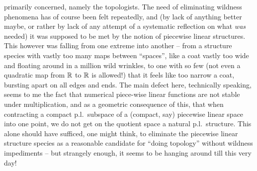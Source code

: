 primarily concerned, namely the topologists. The need of eliminating
wildness phenomena has of course been felt repeatedly, and (by lack of
anything better maybe, or rather by lack of any attempt of a
systematic reflection on what \emph{was} needed) it was supposed to be
met by the notion of piecewise linear structures. This however was
falling from one extreme into another -- from a structure species with
vastly too many maps between ``spaces'', like a coat vastly too wide
and floating around in a million wild wrinkles, to one with so few
(not even a quadratic map from ${\mathbb{R}}$ to ${\mathbb{R}}$ is allowed!) that it
feels like too narrow a coat, bursting apart on all edges and
ends. The main defect here, technically speaking, seems to me the fact
that numerical piece-wise linear functions are not stable under
multiplication, and as a geometric consequence of this, that when
contracting a compact p.l.\ subspace of a (compact, say) piecewise
linear space into one point, we do not get on the quotient space a
natural p.l.\ structure. This alone should have sufficed, one might
think, to eliminate the piecewise linear structure species as a
reasonable candidate for ``doing topology'' without wildness
impediments -- but strangely enough, it seems to be hanging around
till this very day!

